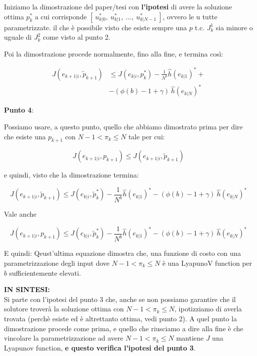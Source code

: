\documentclass[12pt]{article}
\begin{document}
Iniziamo la dimostrazione del paper/tesi con \textbf{l'ipotesi} di avere la soluzione ottima $p_k^*$ a cui corrisponde $[\ u_{k|0}^*,\ u_{k|1}^*,\  \dots,\  u_{k|{N-1}}^*\ ]$, ovvero le u tutte parametrizzate. il che è possibile visto che esiste sempre una $p$ t.c. $J_k^1$ sia minore o uguale di $J_k^2$ come visto al punto 2. 

Poi la dimostrazione procede normalmente, fino alla fine, e termina così:

\begin{equation*}
    \begin{split}
        J({e}_{k+1|i},\tilde{p}_{k+1})&\le J({e}_{k|i},p_{k}^*) - \frac{1}{N^b}\hat{h}(e_{k|1})^*+ \\ 
            &-(\phi(b)-1+\gamma)\ \hat{h}(e_{k|N})^*
    \end{split}
\end{equation*}

\textbf{Punto 4}:

Possiamo usare, a questo punto, quello che abbiamo dimostrato prima per dire che esiste una $p_{k+1}$ con $N-1 < \pi_k \leq N$ tale per cui:

\begin{equation}
	J({e}_{k+1|i},p_{k+1}) \leq J({e}_{k+1|i},\tilde{p}_{k+1})
\end{equation}

e quindi, visto che la dimostrazione termina:

\begin{equation}
	J({e}_{k+1|i},\tilde{p}_{k+1}) \leq J({e}_{k|i},\tilde{p}_k^*)- \frac{1}{N^b}\hat{h}(e_{k|1})^*-(\phi(b)-1+\gamma)\ \hat{h}(e_{k|N})^*
\end{equation}

Vale anche

\begin{equation}
	J({e}_{k+1|i},p_{k+1}) \leq J({e}_{k|i},\tilde{p}_k^*)- \frac{1}{N^b}\hat{h}(e_{k|1})^*-(\phi(b)-1+\gamma)\ \hat{h}(e_{k|N})^*
	\label{eq5}
\end{equation}

E quindi: 
Qeust'ultima equazione dimostra che, una funzione di costo con una parametrizzazione degli input dove $N-1 < \pi_k \leq N$ è una LyapunoV function per $b$ sufficientemente elevati.

\textbf{IN SINTESI:}\\
Si parte con l'ipotesi del punto 3 che, anche se non possiamo garantire che il solutore troverà la soluzione ottima con $N-1 < \pi_k \leq N$, ipotizziamo di averla trovata (perchè esiste ed è altrettanto ottima, vedi punto 2). A quel punto la dimostrazione procede come prima, e quello che riusciamo a dire alla fine è che vincolare la parametrizzazione ad avere $N-1 < \pi_k \leq N$ mantiene $J$ una Lyapunov function, \textbf{e questo verifica l'ipotesi del punto 3}.
\end{document}
